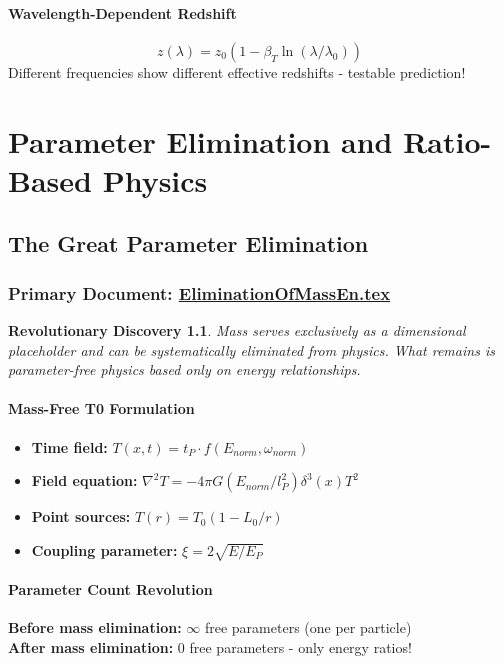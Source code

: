 \documentclass[12pt,a4paper]{report}
\newtheorem{discovery}{Revolutionary Discovery}[chapter]
\begin{document}
	\subsubsection{Wavelength-Dependent Redshift}
	$$z(\lambda) = z_0(1 - \beta_T \ln(\lambda/\lambda_0))$$
	Different frequencies show different effective redshifts - testable prediction!
	
	\chapter{Parameter Elimination and Ratio-Based Physics}
	
	\section{The Great Parameter Elimination}
	\subsection{Primary Document: \href{https://github.com/jpascher/T0-Time-Mass-Duality/tree/main/2/pdf/EliminationOfMassEn.pdf}{EliminationOfMassEn.tex}}
	
	\begin{discovery}
		Mass serves exclusively as a dimensional placeholder and can be systematically eliminated from physics. What remains is parameter-free physics based only on energy relationships.
	\end{discovery}
	
	\subsubsection{Mass-Free T0 Formulation}
	\begin{itemize}
		\item \textbf{Time field:} $T(x,t) = t_P \cdot f(E_{norm}, \omega_{norm})$
		\item \textbf{Field equation:} $\nabla^2 T = -4\pi G(E_{norm}/l_P^2)\delta^3(x)T^2$
		\item \textbf{Point sources:} $T(r) = T_0(1 - L_0/r)$
		\item \textbf{Coupling parameter:} $\xi = 2\sqrt{E/E_P}$
	\end{itemize}
	
	\subsubsection{Parameter Count Revolution}
	\textbf{Before mass elimination:} $\infty$ free parameters (one per particle)\\
	\textbf{After mass elimination:} 0 free parameters - only energy ratios!
	
\end{document}
